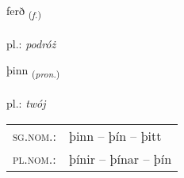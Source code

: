 \documentclass[frontgrid, backgrid]{flacards}\usepackage[]{graphicx}\usepackage[]{xcolor}
\begin{document}
\renewcommand{\flhead}{\vskip5pt \fboxsep=0pt {\small\bfseries\footnotesize Nafnorð | rzeczownik}}
\renewcommand{\fcfoot}{\vskip5pt \fboxsep=0pt \hspace{2pt}{\small\bfseries\footnotesize 1K}}

\renewcommand{\blhead}{\vskip5pt {\small\bfseries\footnotesize Nafnorð | rzeczownik }}
\renewcommand{\bcfoot}{\vskip5pt \hspace{2pt}{\small\bfseries\footnotesize 1K}}


{ferð \small{\textsubscript{(\textit{f.})}} \\[1ex] %
\textphonetic{[fɛrð]} \\
pl.: \emph{podróż} \\  [2ex]
\renewcommand*{\arraystretch}{0.8}
}

\renewcommand{\flhead}{\vskip5pt \fboxsep=0pt {\small\bfseries\footnotesize Fornafn | zaimek}}
\renewcommand{\fcfoot}{\vskip5pt \fboxsep=0pt \hspace{2pt}{\small\bfseries\footnotesize 1K}}

\renewcommand{\blhead}{\vskip5pt {\small\bfseries\footnotesize Fornafn | zaimek }}
\renewcommand{\bcfoot}{\vskip5pt \hspace{2pt}{\small\bfseries\footnotesize 1K}}


{þinn \small{\textsubscript{(\textit{pron.})}} \\[1ex] %
\textphonetic{[θɪn]} \\
pl.: \emph{twój} \\  [2ex]
\renewcommand*{\arraystretch}{0.8}
\begin{tabular}{ll}
\textsc{sg.nom.}: & þinn  --  þín -- þitt \\ 
\textsc{pl.nom.}: & þínir -- þínar -- þín
\end{tabular}
}
\end{document}

